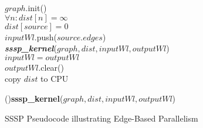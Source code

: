 \begin{algorithm}[t]
\begin{small}


\BlankLine
$graph$.init()\\
$\forall n: dist[n] = \infty$	\label{distinit-line} \\ 
$dist[source] = 0$ 		\label{distinitsource-line} \\
$inputWl$.push($source.edges$)\\

\BlankLine
{} {	\label{whilestart-line}
   \textbf{\textit{sssp\_kernel}}($graph, dist, inputWl, outputWl$) \\
   $inputWl = outputWl$\\
   $outputWl$.clear() \\
}	\label{whileend-line}
copy $dist$ to CPU 

\BlankLine
\Fn(){\textbf{sssp\_kernel}($graph, dist, inputWl, outputWl$)}	{


\For{each edge $e$ assigned to me}{ \tcc{round-robin edge assignment}
  $altdist = dist[e.source] + e.weight$ \\
 
  \If{$dist[e.destination] > altdist$}{
    $dist[e.destination]$ = $altdist$ \\
    $outputWl.push(e.destination.edges)$ \label{work-chunk-line} \\
  }
}
}
\caption{SSSP Pseudocode illustrating Edge-Based Parallelism}
\label{EP-cpu-pseudocode}
\label{EP-gpu-pseudocode}
\end{small}
\end{algorithm}



